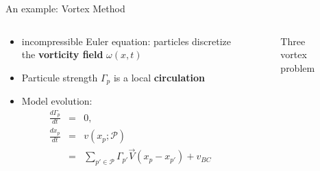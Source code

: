 \documentclass[aspectratio=169]{beamer} %
\begin{document}
\begin{frame}{An example: Vortex Method~\footnotemark[1]}
    \begin{columns}[t]
        \begin{column}{0.4\textwidth}
            \begin{itemize}
                \item incompressible Euler equation: particles discretize the \textbf{vorticity field} $\omega(x, t)$
                \item Particule strength $\Gamma_p$ is a local \textbf{circulation}
                \item Model evolution: \\
                      \begin{eqnarray*}
                          \frac{d\Gamma_p}{dt} &=& 0, \\
                          \frac{d x_p}{d t} &=& v(x_p; \mathcal P) \\
                          &=& \sum_{p' \in \mathcal P} \Gamma_{p'} \vec{V}(x_p - x_{p'}) + v_{BC} \\
                      \end{eqnarray*}
            \end{itemize}
        \end{column}
        \begin{column}{0.6\textwidth}
            \begin{figure}
                \centering
                \caption*{Three vortex problem}
            \end{figure}
        \end{column}
    \end{columns}

\end{frame}
\end{document}
